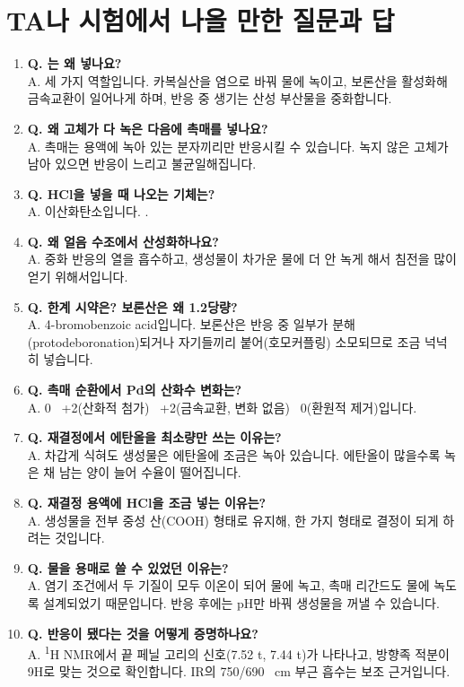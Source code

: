 \documentclass[10pt,a4paper]{article}
\begin{document}
\section{TA나 시험에서 나올 만한 질문과 답}

\begin{enumerate}[leftmargin=6mm,itemsep=1.2mm]
\item \textbf{Q. 는 왜 넣나요?}\\ A. 세 가지 역할입니다. 카복실산을 염으로 바꿔 물에 녹이고, 보론산을 활성화해 금속교환이 일어나게 하며, 반응 중 생기는 산성 부산물을 중화합니다.
\item \textbf{Q. 왜 고체가 다 녹은 다음에 촉매를 넣나요?}\\ A. 촉매는 용액에 녹아 있는 분자끼리만 반응시킬 수 있습니다. 녹지 않은 고체가 남아 있으면 반응이 느리고 불균일해집니다.
\item \textbf{Q. HCl을 넣을 때 나오는 기체는?}\\ A. 이산화탄소입니다. .
\item \textbf{Q. 왜 얼음 수조에서 산성화하나요?}\\ A. 중화 반응의 열을 흡수하고, 생성물이 차가운 물에 더 안 녹게 해서 침전을 많이 얻기 위해서입니다.
\item \textbf{Q. 한계 시약은? 보론산은 왜 1.2당량?}\\ A. 4-bromobenzoic acid입니다. 보론산은 반응 중 일부가 분해(protodeboronation)되거나 자기들끼리 붙어(호모커플링) 소모되므로 조금 넉넉히 넣습니다.
\item \textbf{Q. 촉매 순환에서 Pd의 산화수 변화는?}\\ A. 0 \textrightarrow\ +2(산화적 첨가) \textrightarrow\ +2(금속교환, 변화 없음) \textrightarrow\ 0(환원적 제거)입니다.
\item \textbf{Q. 재결정에서 에탄올을 최소량만 쓰는 이유는?}\\ A. 차갑게 식혀도 생성물은 에탄올에 조금은 녹아 있습니다. 에탄올이 많을수록 녹은 채 남는 양이 늘어 수율이 떨어집니다.
\item \textbf{Q. 재결정 용액에 HCl을 조금 넣는 이유는?}\\ A. 생성물을 전부 중성 산(COOH) 형태로 유지해, 한 가지 형태로 결정이 되게 하려는 것입니다.
\item \textbf{Q. 물을 용매로 쓸 수 있었던 이유는?}\\ A. 염기 조건에서 두 기질이 모두 이온이 되어 물에 녹고, 촉매 리간드도 물에 녹도록 설계되었기 때문입니다. 반응 후에는 pH만 바꿔 생성물을 꺼낼 수 있습니다.
\item \textbf{Q. 반응이 됐다는 것을 어떻게 증명하나요?}\\ A. \textsuperscript{1}H NMR에서 끝 페닐 고리의 신호(7.52 t, 7.44 t)가 나타나고, 방향족 적분이 9H로 맞는 것으로 확인합니다. IR의 750/690 \si{\per\centi\metre} 부근 흡수는 보조 근거입니다.

\end{enumerate}
\end{document}
